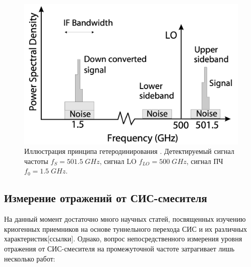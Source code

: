 \documentclass[a4paper]{article}
\begin{document}
\begin{figure}[H]
    \centering
    \includegraphics[scale=0.5]{heterodyne.png}
    \caption{Иллюстрация принципа гетеродинирования \cite{Barichev}. Детектируемый сигнал частоты $f_S = 501.5\; GHz$, сигнал LO  $f_{LO} = 500 \; GHz$, сигнал ПЧ $f_0 = 1.5 \; GHz$.}
    \label{fig:heterodyne}
\end{figure}


\subsection{Измерение отражений от СИС-смесителя}

На данный момент достаточно много научных статей, посвященных изучению криогенных приемников на основе туннельного перехода СИС и их различных характеристик[ссылки].
Однако, вопрос непосредственного измерения уровня отражения от СИС-смесителя на промежуточной частоте затрагивает лишь несколько работ:
\par
\end{document}

